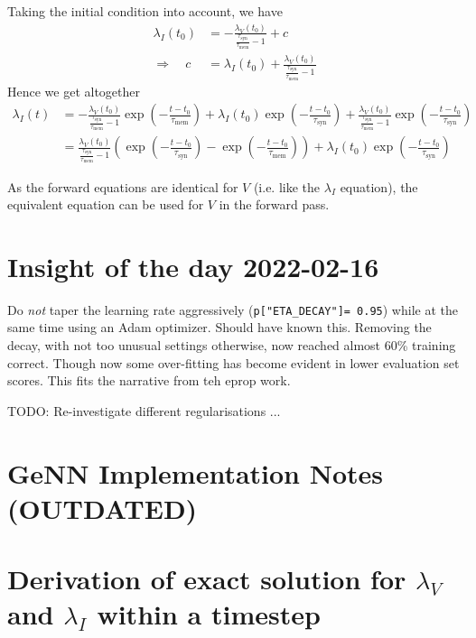 \documentclass[a4paper]{article}
\begin{document}
Taking the initial condition into account, we have
\begin{align}
  \lambda_I(t_0) &= -\frac{\lambda_V(t_0)}{\frac{\tau_{\text{syn}}}{\tau_{\text{mem}}} -1} + c \\
  \Rightarrow \quad c &= \lambda_I(t_0) + \frac{\lambda_V(t_0)}{\frac{\tau_{\text{syn}}}{\tau_{\text{mem}}} -1}
\end{align}
Hence we get altogether
\begin{align}
  \lambda_I(t) &= -\frac{\lambda_V(t_0)}{\frac{\tau_{\text{syn}}}{\tau_{\text{mem}}} -1} \exp\left(-\frac{t-t_0}{\tau_{\text{mem}}} \right) + \lambda_I(t_0) \exp\left(-\frac{t-t_0}{\tau_{\text{syn}}}\right) + \frac{\lambda_V(t_0)}{\frac{\tau_{\text{syn}}}{\tau_{\text{mem}}} -1} \exp\left(-\frac{t-t_0}{\tau_{\text{syn}}}\right) \\
  &= \frac{\lambda_V(t_0)}{\frac{\tau_{\text{syn}}}{\tau_{\text{mem}}} -1} \left(\exp\left(-\frac{t-t_0}{\tau_{\text{syn}}}\right) - \exp\left(-\frac{t-t_0}{\tau_{\text{mem}}} \right) \right) + \lambda_I(t_0) \exp\left(-\frac{t-t_0}{\tau_{\text{syn}}}\right)
\end{align}

As the forward equations are identical for $V$ (i.e. like the $\lambda_I$ equation), the equivalent equation can be used for $V$ in the forward pass.

\section{Insight of the day 2022-02-16}
  Do {\em not} taper the learning rate aggressively (\verb+p["ETA_DECAY"]= 0.95+) while at the same time using an Adam optimizer. Should have known this. Removing the decay, with not too unusual settings otherwise, now reached almost 60\% training correct. Though now some over-fitting has become evident in lower evaluation set scores. This fits the narrative from teh eprop work.

  TODO: Re-investigate different regularisations ...

\section{GeNN Implementation Notes (OUTDATED)}
\section{Derivation of exact solution for $\lambda_V$ and $\lambda_I$
  within a timestep}
\end{document}
